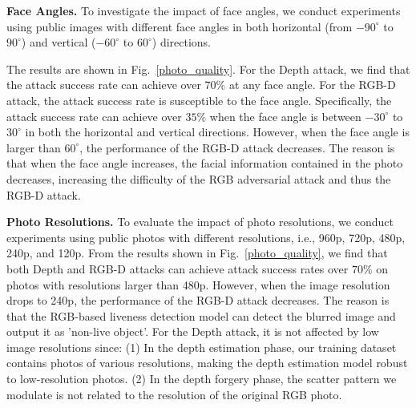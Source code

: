 \textbf{Face Angles.}
To investigate the impact of face angles, we conduct experiments using public images with different face angles in both horizontal (from $-90^\circ$ to $90^\circ$) and vertical  ($-60^\circ$ to $60^\circ$) directions. 

The results are shown in Fig.~\ref{photo_quality}. For the Depth attack, we find that the attack success rate can achieve over $70\%$ at any face angle. 
For the RGB-D attack, the attack success rate is susceptible to the face angle. Specifically, the attack success rate can achieve over $35\%$ when the face angle is between $-30^\circ$  to $30^\circ$ in both the horizontal and vertical directions. However, when the face angle is larger than $60^\circ$, the performance of the RGB-D attack decreases.
The reason is that when the face angle increases, the facial information contained in the photo decreases, increasing the difficulty of the RGB adversarial attack and thus the RGB-D attack.





\textbf{Photo Resolutions.}
To evaluate the impact of photo resolutions, we conduct experiments using  public photos with different resolutions, i.e., 960p, 720p, 480p, 240p, and 120p. From the results shown in Fig.~\ref{photo_quality}, we find that both Depth and  RGB-D attacks can achieve attack success rates over $70\%$ on photos with resolutions larger than 480p. 
However, when the image resolution drops to 240p, the performance of the RGB-D attack decreases.
The reason is that the RGB-based liveness detection model can detect the blurred image and output it as 'non-live object'. 
For the Depth attack, it is not affected by low image resolutions since: (1) In the depth estimation phase, our training dataset contains photos of various resolutions, making the depth estimation model robust to low-resolution photos. (2) In the depth forgery phase, the scatter pattern we modulate is not related to the resolution of the original RGB photo.

